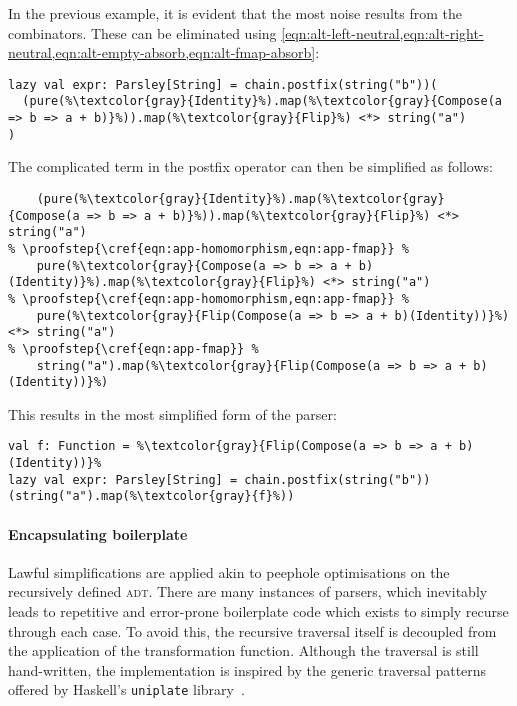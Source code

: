 \documentclass[../../main.tex]{subfiles}
\begin{document}
In the previous example, it is evident that the most noise results from the  combinators.
These can be eliminated using \cref{eqn:alt-left-neutral,eqn:alt-right-neutral,eqn:alt-empty-absorb,eqn:alt-fmap-absorb}:
\begin{verbatim}
lazy val expr: Parsley[String] = chain.postfix(string("b"))(
  (pure(%\textcolor{gray}{Identity}%).map(%\textcolor{gray}{Compose(a => b => a + b)}%)).map(%\textcolor{gray}{Flip}%) <*> string("a")
)
\end{verbatim}
%
The complicated term in the postfix operator can then be simplified as follows:
\begin{verbatim}
    (pure(%\textcolor{gray}{Identity}%).map(%\textcolor{gray}{Compose(a => b => a + b)}%)).map(%\textcolor{gray}{Flip}%) <*> string("a")
% \proofstep{\cref{eqn:app-homomorphism,eqn:app-fmap}} %
    pure(%\textcolor{gray}{Compose(a => b => a + b)(Identity)}%).map(%\textcolor{gray}{Flip}%) <*> string("a")
% \proofstep{\cref{eqn:app-homomorphism,eqn:app-fmap}} %
    pure(%\textcolor{gray}{Flip(Compose(a => b => a + b)(Identity))}%) <*> string("a")
% \proofstep{\cref{eqn:app-fmap}} %
    string("a").map(%\textcolor{gray}{Flip(Compose(a => b => a + b)(Identity))}%)
\end{verbatim}
%
This results in the most simplified form of the parser:
\begin{verbatim}
val f: Function = %\textcolor{gray}{Flip(Compose(a => b => a + b)(Identity))}%
lazy val expr: Parsley[String] = chain.postfix(string("b"))(string("a").map(%\textcolor{gray}{f}%))
\end{verbatim}

\paragraph{Encapsulating boilerplate}
Lawful simplifications are applied akin to peephole optimisations on the recursively defined  \textsc{adt}.
There are many instances of parsers, which inevitably leads to repetitive and error-prone boilerplate code which exists to simply recurse through each case.
To avoid this, the recursive traversal itself is decoupled from the application of the transformation function.
Although the traversal is still hand-written, the implementation is inspired by the generic traversal patterns offered by Haskell's \texttt{uniplate} library~\cite{mitchell_uniform_2007}.
\end{document}
